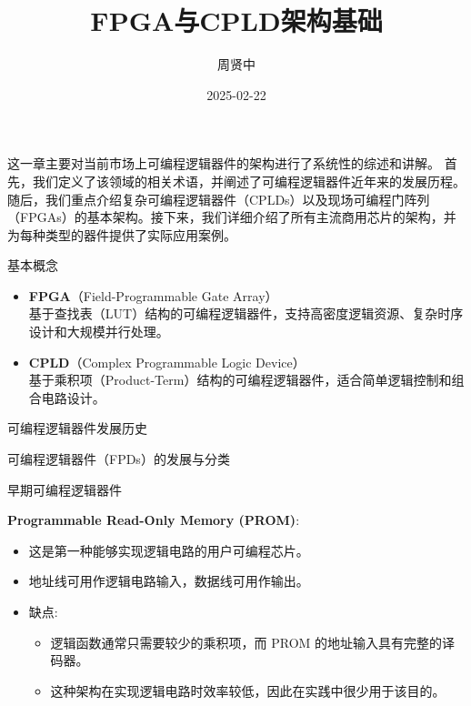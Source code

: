 \documentclass[
  ignorenonframetext,
  chinese,
]{beamer}
\title{FPGA与CPLD架构基础}
\author{周贤中}
\date{2025-02-22}
\providecommand{\tightlist}{%
  \setlength{\itemsep}{0pt}\setlength{\parskip}{0pt}}
\begin{document}
\frame{\titlepage}

\begin{frame}
这一章主要对当前市场上可编程逻辑器件的架构进行了系统性的综述和讲解。
首先，我们定义了该领域的相关术语，并阐述了可编程逻辑器件近年来的发展历程。
随后，我们重点介绍复杂可编程逻辑器件（CPLDs）以及现场可编程门阵列（FPGAs）的基本架构。接下来，我们详细介绍了所有主流商用芯片的架构，并为每种类型的器件提供了实际应用案例。
\end{frame}

\begin{frame}{基本概念}
\label{ux57faux672cux6982ux5ff5}
\begin{itemize}
\item
  \textbf{FPGA}（Field-Programmable Gate Array）\\
  基于查找表（LUT）结构的可编程逻辑器件，支持高密度逻辑资源、复杂时序设计和大规模并行处理。
\item
  \textbf{CPLD}（Complex Programmable Logic Device）\\
  基于乘积项（Product-Term）结构的可编程逻辑器件，适合简单逻辑控制和组合电路设计。
\end{itemize}
\end{frame}

\begin{frame}{可编程逻辑器件发展历史}
\label{ux53efux7f16ux7a0bux903bux8f91ux5668ux4ef6ux53d1ux5c55ux5386ux53f2}
\begin{block}{可编程逻辑器件（FPDs）的发展与分类}
\label{ux53efux7f16ux7a0bux903bux8f91ux5668ux4ef6fpdsux7684ux53d1ux5c55ux4e0eux5206ux7c7b}
\begin{block}{早期可编程逻辑器件}
\label{ux65e9ux671fux53efux7f16ux7a0bux903bux8f91ux5668ux4ef6}
\begin{block}{\textbf{Programmable Read-Only Memory (PROM)}:}
\label{programmable-read-only-memory-prom}
\begin{itemize}
\tightlist
\item
  这是第一种能够实现逻辑电路的用户可编程芯片。
\item
  地址线可用作逻辑电路输入，数据线可用作输出。
\item
  缺点:

  \begin{itemize}
  \tightlist
  \item
    逻辑函数通常只需要较少的乘积项，而 PROM 的地址输入具有完整的译码器。
  \item
    这种架构在实现逻辑电路时效率较低，因此在实践中很少用于该目的。
  \end{itemize}
\end{itemize}
\end{block}
\end{block}
\end{block}
\end{frame}
\end{document}
